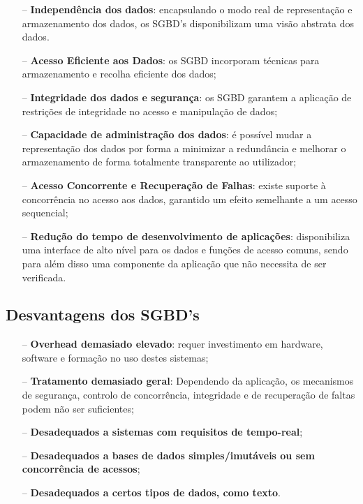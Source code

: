 \documentclass[oneside]{book}
\theoremstyle{definition}
\begin{document}
\begin{itemize}
    \itemsep0cm
    \item[--]\textbf{Independência dos dados}: encapsulando o modo real de representação e armazenamento dos dados, os SGBD's disponibilizam uma visão abstrata dos dados.
    \item[--]\textbf{Acesso Eficiente aos Dados}: os SGBD incorporam técnicas para armazenamento e recolha eficiente dos dados;
    \item[--]\textbf{Integridade dos dados e segurança}: os SGBD garantem a aplicação de restrições de integridade no acesso e manipulação de dados;
    \item[--]\textbf{Capacidade de administração dos dados}: é possível mudar a representação dos dados por forma a minimizar a redundância e melhorar o armazenamento de forma totalmente transparente ao utilizador;
    \item[--]\textbf{Acesso Concorrente e Recuperação de Falhas}: existe suporte à concorrência no acesso aos dados, garantido um efeito semelhante a um acesso sequencial;
    \item[--]\textbf{Redução do tempo de desenvolvimento de aplicações}: disponibiliza uma interface de alto nível para os dados e funções de acesso comuns, sendo para além disso uma componente da aplicação que não necessita de ser verificada.  
\end{itemize}

\subsection{Desvantagens dos SGBD's}

\begin{itemize}
    \itemsep0cm
    \item[--]\textbf{Overhead demasiado elevado}: requer investimento em hardware, software e formação no uso destes sistemas;
    \item[--]\textbf{Tratamento demasiado geral}: Dependendo da aplicação, os mecanismos de segurança, controlo de concorrência, integridade e de recuperação de faltas podem não ser suficientes;
    \item[--]\textbf{Desadequados a sistemas com requisitos de tempo-real};
    \item[--]\textbf{Desadequados a bases de dados simples/imutáveis ou sem concorrência de acessos};
    \item[--]\textbf{Desadequados a certos tipos de dados, como texto}.   
\end{itemize}
\end{document}
